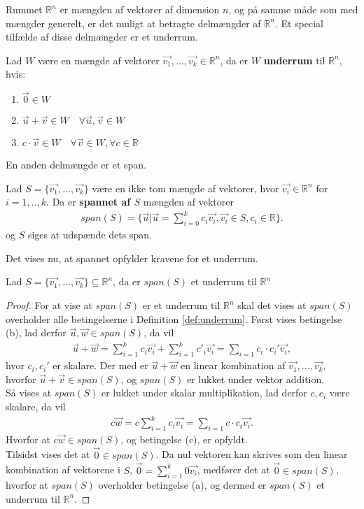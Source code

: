Rummet $\mathds{R}^n$ er mængden af vektorer af dimension $n$, og på samme måde som med mængder generelt, er det muligt at betragte delmængder af $\mathds{R}^n$.
Et special tilfælde af disse delmængder er et underrum.
\begin{defn}[Underrum]
Lad $W$ være en mængde af vektorer $\vec{v_1},...,\vec{v_k} \in \mathds{R}^n$, da er $W$  \textbf{underrum} til $\mathds{R}^n$, hvis:
\begin{enumerate}[label=\alph*]
\item $\vec{0} \in W$
\item $\vec{u}+\vec{v} \in W \quad \forall \vec{u}, \vec{v} \in W$
\item $c \cdot \vec{v} \in W \quad \forall \vec{v} \in W, \forall c \in \mathds{R}$
\end{enumerate}
\label{def:underrum}
\end{defn}
En anden delmængde er et span.
\begin{defn}[Span]
Lad $S=\{\vec{v_1},...,\vec{v_k}\}$ være en ikke tom mængde af vektorer, hvor $\vec{v_i} \in \mathds{R}^n$ for $i = 1,..,k$. 
Da er \textbf{spannet af $S$} mængden af vektorer
\begin{align*}
span(S) = \{\vec{u}| \vec{u}=\sum_{i=0}^k c_i \vec{v_i}, \vec{v_i} \in S, c_i \in \mathds{R}\}.
\end{align*} 
og $S$ siges at udspænde dets span.
\label{def:span}
\end{defn}
Det vises nu, at spannet opfylder kravene for et underrum.
\begin{stn}
Lad $S=\{\vec{v_1},...,\vec{v_k}\} \subseteq \mathds{R}^n$, da er $span(S)$ et underrum til $\mathds{R}^n$
\label{stn:spanunderrum}
\end{stn}
\begin{proof}
For at vise at $span(S)$ er et underrum til $\mathds{R}^n$ skal det vises at $span(S)$ overholder alle betingelserne i Definition \ref{def:underrum}.
Først vises betingelse (b), lad  derfor $\vec{u}, \vec{w} \in span(S)$, da vil 
\begin{align*}
\vec{u}+\vec{w}= \sum_{i=1}^k c_i \vec{v_i} + \sum_{i=1}^k c'_i \vec{v_i} = \sum_{i=1} c_i\cdot c_i' \vec{v_i},
\end{align*}
hvor $c_i, c_i'$ er skalare.
Der med er $\vec{u}+\vec{w}$ en linear kombination af $\vec{v_1},...,\vec{v_k}$, hvorfor $\vec{u}+\vec{v} \in span(S)$, og $span(S)$ er lukket under vektor addition.
\\ Så vises at $span(S)$ er lukket under skalar multiplikation, lad derfor $c, c_i$ være skalare, da vil
\begin{align*}
c\vec{w}= c\sum_{i=1}^k c_i \vec{v_i}  = \sum_{i=1} c \cdot c_i \vec{v_i}.
\end{align*}
Hvorfor at $c\vec{w} \in span(S)$, og betingelse (c), er opfyldt.
\\Tilsidst vises det at $\vec{0} \in span(S)$.
Da nul vektoren kan skrives som den linear kombination af vektorene i $S$, $\vec{0} = \sum_{i=1}^k 0 \vec{v_i}$, medfører det at $\vec{0} \in span(S)$, hvorfor at $span(S)$ overholder betingelse (a), og dermed er $span(S)$ et underrum til $\mathds{R}^n$.
\end{proof}
